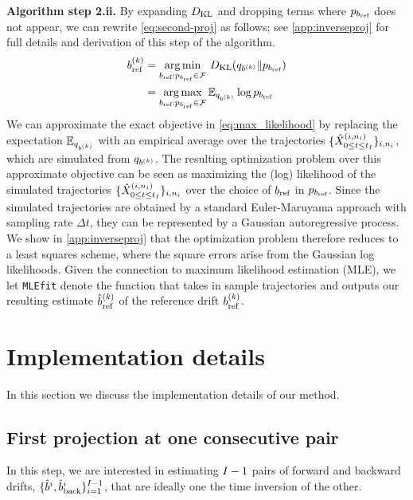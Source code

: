 \textbf{Algorithm step 2.ii.}
By expanding $D_{\mathrm{KL}}$ and dropping terms where $\refden_{\refdrift}$ does not appear, we can rewrite \cref{eq:second-proj} as follows; see \cref{app:inverseproj} for full details and derivation of this step of the algorithm. 
\begin{align}
    \refdrift^{(\iteralgo)} &= \argmin_{\refdrift: \refden_{\refdrift}\in\modelfamily} \, \KL(\bridge_{\drift^{(\iteralgo)}} \| \refden_{\refdrift}) \\
    &= \argmax_{\refdrift: \refden_{\refdrift}\in\modelfamily} \mathbb{E}_{\bridge_{\drift^{(\iteralgo)}}} \log \refden_{\refdrift}
    \label{eq:max_likelihood}
\end{align}
We can approximate the exact objective in \cref{eq:max_likelihood}
by replacing the expectation $\mathbb{E}_{\bridge_{\drift^{(\iteralgo)}}}$ with an empirical average over the trajectories $\{\simulatedresponseat{0\le \timet\le \timestep{\totsteps}}^{(\timeidx,\sampleidx_{\timeidx})}\}_{\timeidx,\sampleidx_{\timeidx}}$, which are simulated from $\bridge_{\drift^{(\iteralgo)}}$. The resulting optimization problem over this approximate objective can be seen as maximizing the (log) likelihood of the simulated trajectories $\{\simulatedresponseat{0\le \timet\le \timestep{\totsteps}}^{(\timeidx,\sampleidx_{\timeidx})}\}_{\timeidx,\sampleidx_{\timeidx}}$ over the choice of $\refdrift$ in $\refden_{\refdrift}$.
Since the simulated trajectories are obtained by a standard Euler-Maruyama approach with sampling rate $\Delta t$, they can be represented by a Gaussian autoregressive process.
We show in \cref{app:inverseproj} that the optimization problem therefore reduces to a least squares scheme, where the square errors arise from the Gaussian log likelihoods. Given the connection to maximum likelihood estimation (MLE), we let \texttt{MLEfit} denote the function that takes in sample trajectories and outputs our resulting estimate $\estimaterefdriftstep{(\iteralgo)}$ of the reference drift $\refdrift^{(\iteralgo)}$.


\section{Implementation details}
\label{sec:implementation}

In this section we discuss the implementation details of our method.

\subsection{First projection at one consecutive pair}
\label{sec:first_projection_implementation}
In this step, we are interested in estimating $I-1$ pairs of forward and backward drifts, $\{\estimatedriftstep{i},\estimatebackwarddriftstep{i}\}_{\timeidx = 1}^{\totsteps-1}$, that are ideally one the time inversion of the other. 

